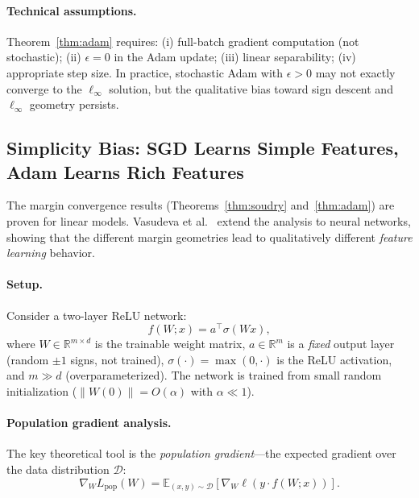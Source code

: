 \documentclass{article}
\begin{document}
\paragraph{Technical assumptions.} Theorem~\ref{thm:adam} requires: (i) full-batch gradient computation (not stochastic); (ii) $\epsilon = 0$ in the Adam update; (iii) linear separability; (iv) appropriate step size. In practice, stochastic Adam with $\epsilon > 0$ may not exactly converge to the $\ell_\infty$ solution, but the qualitative bias toward sign descent and $\ell_\infty$ geometry persists.

\subsection{Simplicity Bias: SGD Learns Simple Features, Adam Learns Rich Features}
\label{sec:simplicity}

The margin convergence results (Theorems~\ref{thm:soudry} and~\ref{thm:adam}) are proven for linear models. Vasudeva et al.~\cite{vasudeva2025} extend the analysis to neural networks, showing that the different margin geometries lead to qualitatively different \emph{feature learning} behavior.

\paragraph{Setup.} Consider a two-layer ReLU network:
\begin{equation}
    f(W; x) = a^\top \sigma(Wx),
\end{equation}
where $W \in \mathbb{R}^{m \times d}$ is the trainable weight matrix, $a \in \mathbb{R}^m$ is a \emph{fixed} output layer (random $\pm 1$ signs, not trained), $\sigma(\cdot) = \max(0, \cdot)$ is the ReLU activation, and $m \gg d$ (overparameterized). The network is trained from small random initialization ($\|W(0)\| = O(\alpha)$ with $\alpha \ll 1$).

\paragraph{Population gradient analysis.} The key theoretical tool is the \emph{population gradient}---the expected gradient over the data distribution $\mathcal{D}$:
\begin{equation}
    \nabla_W L_{\text{pop}}(W) = \mathbb{E}_{(x,y) \sim \mathcal{D}} \left[ \nabla_W \ell(y \cdot f(W; x)) \right].
\end{equation}
\end{document}
